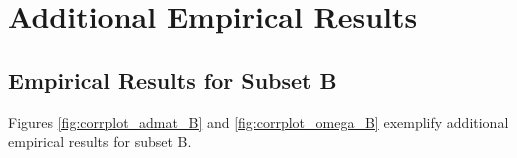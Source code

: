 \section{Additional Empirical Results}

\subsection*{Empirical Results for Subset B}
Figures \ref{fig:corrplot_admat_B} and \ref{fig:corrplot_omega_B} exemplify additional empirical results for subset B.

